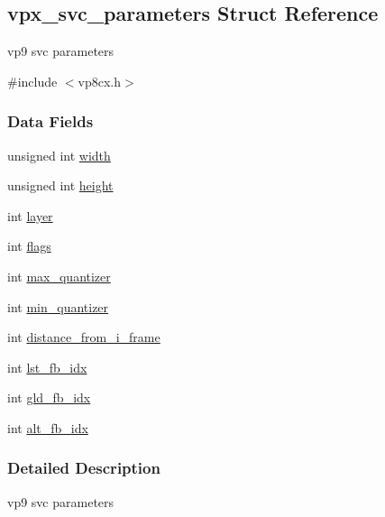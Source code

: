 \hypertarget{structvpx__svc__parameters}{\subsection{vpx\-\_\-svc\-\_\-parameters \-Struct \-Reference}
\label{structvpx__svc__parameters}
}


vp9 svc parameters  




{\ttfamily \#include $<$vp8cx.\-h$>$}

\subsubsection*{\-Data \-Fields}
\begin{DoxyCompactItemize}
\item 
unsigned int \hyperlink{structvpx__svc__parameters_aaf9780718072da62f92440cb2b7343b9}{width}
\item 
unsigned int \hyperlink{structvpx__svc__parameters_ac7af8c9f54e7b2a96b0c30a1004bd45b}{height}
\item 
int \hyperlink{structvpx__svc__parameters_a5f4d45ab6144eb13a3f27809651b40ef}{layer}
\item 
int \hyperlink{structvpx__svc__parameters_a9324b3015839560c5e2bfd1dd550b9aa}{flags}
\item 
int \hyperlink{structvpx__svc__parameters_ac890a24e3ea26902f8d19552f8b7f3c7}{max\-\_\-quantizer}
\item 
int \hyperlink{structvpx__svc__parameters_a4073b4749d687f969d6b23826d9ccefd}{min\-\_\-quantizer}
\item 
int \hyperlink{structvpx__svc__parameters_a0b04ebc9edfc8df09a1b9f65ba2d2ef6}{distance\-\_\-from\-\_\-i\-\_\-frame}
\item 
int \hyperlink{structvpx__svc__parameters_a75d36a52bb1d3a001c668cd577ea7f8b}{lst\-\_\-fb\-\_\-idx}
\item 
int \hyperlink{structvpx__svc__parameters_a1465c3f1805fe1ccf45835b980ee113e}{gld\-\_\-fb\-\_\-idx}
\item 
int \hyperlink{structvpx__svc__parameters_acca4a8ad748ae875e046daece3cd6590}{alt\-\_\-fb\-\_\-idx}
\end{DoxyCompactItemize}


\subsubsection{\-Detailed \-Description}
vp9 svc parameters 

